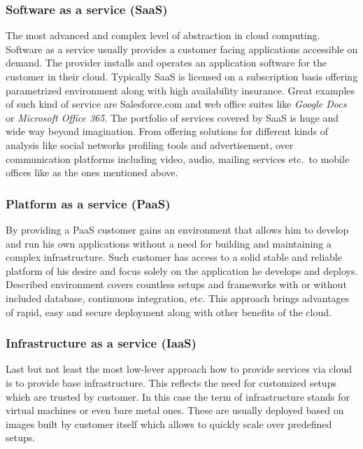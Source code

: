 \subsubsection{Software as a service (SaaS)}
\label{subs:Software as a service (SaaS)}

The most advanced and complex level of abstraction in cloud computing. Software as a service usually provides a customer facing applications accessible on demand. The provider installs and operates an application software for the customer in their cloud. Typically SaaS is licensed on a subscription basis offering parametrized environment along with high availability insurance. Great examples of such kind of service are Salesforce.com and web office suites like \emph{Google Docs} or \emph{Microsoft Office 365}. The portfolio of services covered by SaaS is huge and wide way beyond imagination. From offering solutions for different kinds of analysis like social networks profiling tools and advertisement, over communication platforms including video, audio, mailing services etc.\ to mobile offices like as the ones mentioned above.

\subsubsection{Platform as a service (PaaS)}
\label{subs:Platform as a service (PaaS)}

By providing a PaaS customer gains an environment that allows him to develop and run his own applications without a need for building and maintaining a complex infrastructure. Such customer has access to a solid stable and reliable platform of his desire and focus solely on the application he develops and deploys. Described environment covers countless setups and frameworks with or without included database, continuous integration, etc. This approach brings advantages of rapid, easy and secure deployment along with other benefits of the cloud.

\subsubsection{Infrastructure as a service (IaaS)}
\label{subs:Infrastructure as a service (IaaS)}

Last but not least the most low-lever approach how to provide services via cloud is to provide base infrastructure. This reflects the need for customized setups which are trusted by customer. In this case the term of infrastructure stands for virtual machines or even bare metal ones. These are usually deployed based on images built by customer itself which allows to quickly scale over predefined setups.

